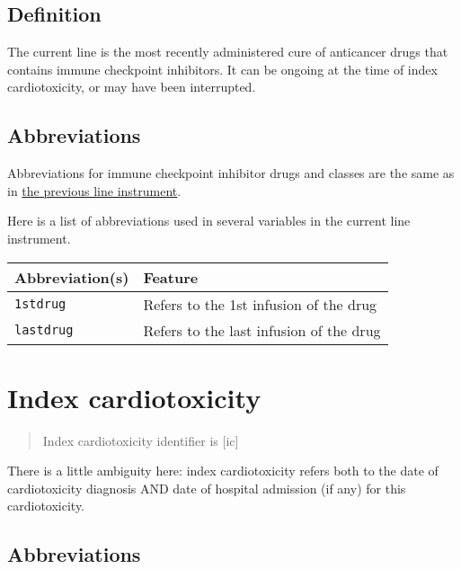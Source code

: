 \documentclass[
]{book}
\begin{document}
\hypertarget{definition}{%
\section{Definition}\label{definition}}

The current line is the most recently administered cure of anticancer drugs that contains immune checkpoint inhibitors. It can be ongoing at the time of index cardiotoxicity, or may have been interrupted.

\hypertarget{abbreviations-1}{%
\section{Abbreviations}\label{abbreviations-1}}

Abbreviations for immune checkpoint inhibitor drugs and classes are the same as in \protect\hyperlink{previous_line_ab_table}{the previous line instrument}.

Here is a list of abbreviations used in several variables in the current line instrument.

\begin{longtable}[]{@{}ll@{}}
\toprule()
Abbreviation(s) & Feature \\
\midrule()
\endhead
\texttt{1stdrug} & Refers to the 1st infusion of the drug \\
\texttt{lastdrug} & Refers to the last infusion of the drug \\
\bottomrule()
\end{longtable}

\hypertarget{index_c}{%
\chapter{Index cardiotoxicity}\label{index_c}}

\begin{quote}
Index cardiotoxicity identifier is {[}ic{]}
\end{quote}

There is a little ambiguity here: index cardiotoxicity refers both to the date of cardiotoxicity diagnosis AND date of hospital admission (if any) for this cardiotoxicity.

\hypertarget{abbreviations-2}{%
\section{Abbreviations}\label{abbreviations-2}}
\end{document}
